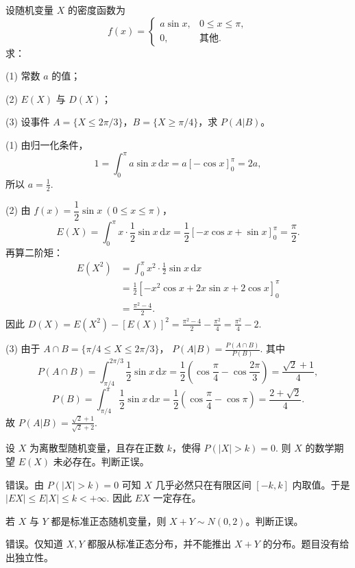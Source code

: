 \documentclass[lang=cn,11pt]{elegantbook}
\begin{document}
\begin{exercise}\label{exer:src-2006-2a-11}
设随机变量 \(X\) 的密度函数为
\[
f(x)=
\begin{cases}
a\sin x, & 0\le x\le \pi,\\
0, & \text{其他}.
\end{cases}
\]
求：\par
(1) 常数 \(a\) 的值；\par
(2) \(E(X)\) 与 \(D(X)\)；\par
(3) 设事件 \(A=\{X\le 2\pi/3\}\)，\(B=\{X\ge \pi/4\}\)，求 \(P(A|B)\)。
\end{exercise}
\begin{solution}
(1) 由归一化条件，
\[
1=\int_0^\pi a\sin x\,\mathrm{d}x
=a[-\cos x]_0^\pi
=2a,
\]
所以
\(
a=\frac12.
\)

(2) 由 \(f(x)=\dfrac12\sin x\ (0\le x\le\pi)\)，
\[
E(X)=\int_0^\pi x\cdot\frac12\sin x\,\mathrm{d}x
=\frac12[-x\cos x+\sin x]_0^\pi
=\frac{\pi}{2}.
\]
再算二阶矩：
\[
\begin{aligned}
E(X^2)
&=\int_0^\pi x^2\cdot\frac12\sin x\,\mathrm{d}x\\
&=\frac12[-x^2\cos x+2x\sin x+2\cos x]_0^\pi\\
&=\frac{\pi^2-4}{2}.
\end{aligned}
\]
因此
\(
D(X)=E(X^2)-[E(X)]^2
=\frac{\pi^2-4}{2}-\frac{\pi^2}{4}
=\frac{\pi^2}{4}-2.
\)

(3) 由于 \(A\cap B=\{\pi/4\le X\le 2\pi/3\}\)，
\(
P(A|B)=\frac{P(A\cap B)}{P(B)}.
\)
其中
\[
P(A\cap B)=\int_{\pi/4}^{2\pi/3}\frac12\sin x\,\mathrm{d}x
=\frac12\left(\cos\frac{\pi}{4}-\cos\frac{2\pi}{3}\right)
=\frac{\sqrt2+1}{4},
\]
\[
P(B)=\int_{\pi/4}^{\pi}\frac12\sin x\,\mathrm{d}x
=\frac12\left(\cos\frac{\pi}{4}-\cos\pi\right)
=\frac{2+\sqrt2}{4}.
\]
故
\(
P(A|B)=\frac{\sqrt2+1}{\sqrt2+2}.
\)
\end{solution}

\begin{exercise}\label{exer:src-2008-01-3a-i-04}\label{exer:src-paper2-tf-04}\label{prob:p2-tf-04}
设 \(X\) 为离散型随机变量，且存在正数 \(k\)，使得
\(
P(|X|>k)=0.
\)
则 \(X\) 的数学期望 \(E(X)\) 未必存在。判断正误。
\end{exercise}
\begin{solution}
错误。由 \(P(|X|>k)=0\) 可知 \(X\) 几乎必然只在有限区间 \([-k,k]\) 内取值。于是
\(
|E X|\le E|X|\le k<+\infty.
\)
因此 \(EX\) 一定存在。
\end{solution}

\begin{exercise}\label{exer:src-2008-01-3c-i-03}\label{exer:src-paper4-i-03}
若 \(X\) 与 \(Y\) 都是标准正态随机变量，则 \(X+Y\sim N(0,2)\)。判断正误。
\end{exercise}
\begin{solution}
错误。仅知道 \(X,Y\) 都服从标准正态分布，并不能推出 \(X+Y\) 的分布。题目没有给出独立性。
\end{solution}
\end{document}
